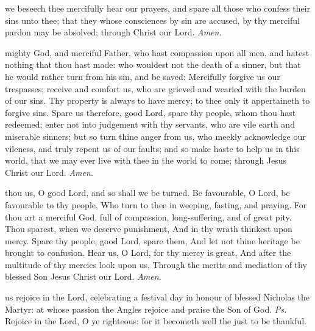  we beseech thee mercifully hear our prayers, and spare all those who confess their sins unto thee; that they whose consciences by sin are accused, by thy merciful pardon may be absolved; through Christ our Lord. \textit{Amen.}

 mighty God, and merciful Father, who hast compassion upon all men, and hatest nothing that thou hast made: who wouldest not the death of a sinner, but that he would rather turn from his sin, and be saved: Mercifully forgive us our trespasses; receive and comfort us, who are grieved and wearied with the burden of our sins. Thy property is always to have mercy; to thee only it appertaineth to forgive sins. Spare us therefore, good Lord, spare thy people, whom thou hast redeemed; enter not into judgement with thy servants, who are vile earth and miserable sinners; but so turn thine anger from us, who meekly acknowledge our vileness, and truly repent us of our faults; and so make haste to help us in this world, that we may ever live with thee in the world to come; through Jesus Christ our Lord. \textit{Amen.}

 thou us, O good Lord, and so shall we be turned. Be favourable, O Lord, be favourable to thy people, Who turn to thee in weeping, fasting, and praying. For thou art a merciful God, full of compassion, long-suffering, and of great pity. Thou sparest, when we deserve punishment, And in thy wrath thinkest upon mercy. Spare thy people, good Lord, spare them, And let not thine heritage be brought to confusion. Hear us, O Lord, for thy mercy is great, And after the multitude of thy mercies look upon us, Through the merits and mediation of thy blessed Son Jesus Christ our Lord. \textit{Amen.}

\introit
{} us rejoice in the Lord, celebrating a festival day in honour of blessed Nicholas the Martyr: at whose passion the Angles rejoice and praise the Son of God. \textit{Ps.} Rejoice in the Lord, O ye righteous: for it becometh well the just to be thankful.

